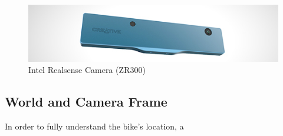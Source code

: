 \documentclass[a4paper,11pt,notitlepage]{article}
\begin{document}
\noindent \begin{figure}[h!]
\includegraphics[width = 1.0\hsize]{./figures/intel_realsense.jpg}
\caption{Intel Realsense Camera (ZR300)}
\label{realsense_camera}
\end{figure}

\subsection{World and Camera Frame}

In order to fully understand the bike's location, a 













\newpage


\end{document}
